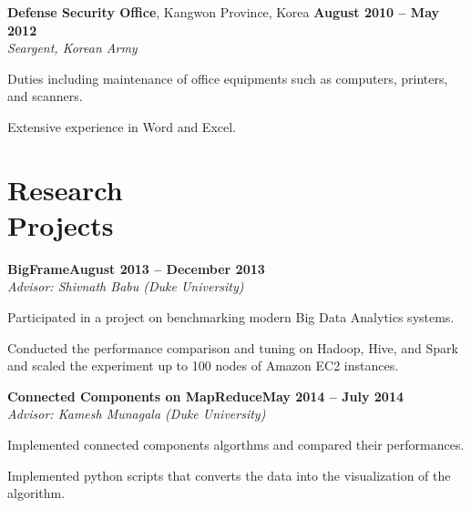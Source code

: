 \documentclass[10pt,margin,line]{resume}
\begin{document}
\begin{resume}
    \textbf{Defense Security Office}, Kangwon Province, Korea \hfill \textbf{August 2010 -- May 2012}\vspace{1mm}\\\vspace{0mm}%
    \textsl{Seargent, Korean Army}
    \begin{list3}
        \item Duties including maintenance of office equipments such as computers, printers, and scanners.
        \item Extensive experience in Word and Excel.
	\end{list3}

    \section{\mysidestyle Research\\Projects}
  	\textbf{BigFrame}\hfill \textbf{August 2013 -- December 2013} \vspace{0mm}\\\vspace{0mm}%
    \textsl{Advisor: Shivnath Babu (Duke University)}
    \vspace{-3mm}\\\vspace{-1mm}%
    \begin{list3}
    	\item Participated in a project on benchmarking modern Big Data Analytics systems.
        \item Conducted the performance comparison and tuning on Hadoop, Hive, and Spark and scaled the experiment up to 100 nodes of Amazon EC2 instances.
	\end{list3}
  	\textbf{Connected Components on MapReduce}\hfill \textbf{May 2014 -- July 2014} \vspace{0mm}\\\vspace{0mm}%
    \textsl{Advisor: Kamesh Munagala (Duke University)}
    \vspace{-3mm}\\\vspace{-1mm}%
    \begin{list3}
        \item Implemented connected components algorthms and compared their performances.
        \item Implemented python scripts that converts the data into the visualization of the algorithm.
	\end{list3}

\end{resume}
\end{document}
